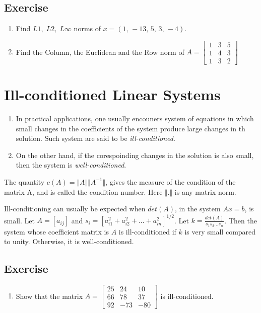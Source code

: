 \documentclass[aima203_lecturenotes_ku.tex]{subfiles}
\begin{document}
\subsection{Exercise}
\begin{enumerate}
\item Find $L1, \; L2, \; L\infty$ norms of $x=(1,\,-13,\,5,\,3,\,-4)$.
\item Find the Column, the Euclidean and the Row norm of $A =
  \begin{bmatrix}
    1 & 3 & 5 \\
    1 & 4 & 3 \\
    1 & 3 & 2
  \end{bmatrix}
  $
\end{enumerate}

\section{Ill-conditioned Linear Systems}
 \begin{enumerate}
 \item In practical applications, one usually encouners system of equations in which small changes in the coefficients of the system produce large changes in th solution. Such system are said to be \textit{ill-conditioned}.

\item On the other hand, if the corespoinding changes in the solution is also small, then the system is \textit{well-conditioned}.
\end{enumerate}

\begin{definition}
  The quantity $c(A) = \Vert A \Vert \Vert A^{-1} \Vert$, gives the measure of the condition of the matrix A, and is called the condition number. Here $\Vert . \Vert$ is any matrix norm.
\end{definition}
Ill-conditioning can usually be expected when $det(A)$, in the system $Ax=b$, is small. Let $A=[a_{ij}]$ and $\displaystyle s_i = \left [ a^2_{i1} + a^2_{i2} + ... + a^2_{in} \right ] ^{1/2}$. Let $\displaystyle k = \frac{det(A)}{s_1s_2...s_n}$. Then the system whose coefficient matrix is $A$ is ill-conditioned if $k$ is very small compared to unity. Otherwise, it is well-conditioned.

  \subsection{Exercise}
  \begin{enumerate}
  \item Show that the matrix $A=   \begin{bmatrix}
    25  & 24 & 10 \\
    66 & 78 & 37 \\
    92 & -73 & -80
  \end{bmatrix}
  $ is ill-conditioned.
  \end{enumerate}
\end{document}
